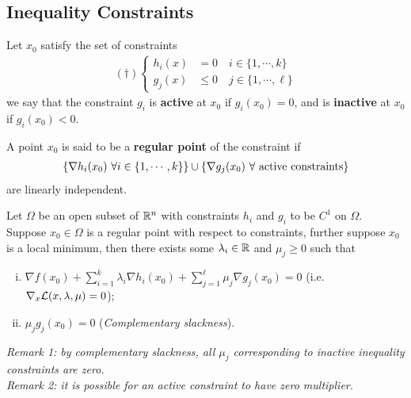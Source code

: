\documentclass{article}
\begin{document}
   	\subsection{Inequality Constraints}
   	\begin{definition}
   		Let $x_0$ satisfy the set of constraints
   		\begin{align}
   			(\dag)\begin{cases}
	   			h_i(x) &= 0\quad i \in \{1, \cdots, k\} \\
   				g_j(x) &\leq 0\quad j \in \{1, \cdots, \ell\}
   			\end{cases}
   		\end{align}
   		we say that the constraint $g_i$ is \textbf{active} at $x_0$ if $g_i(x_0) = 0$, and is \textbf{inactive} at $x_0$ if $g_i(x_0) < 0$.
   	\end{definition}
   	
   	\begin{definition}
   		A point $x_0$ is said to be a \textbf{regular point} of the constraint if 
   		\begin{align}
   			\{\nabla h_i(x_0)\ \forall i \in \{1, \cdots, k\}\}\cup\{ \nabla g_j(x_0)\ \forall \text{{ active constraints}} \}
   		\end{align}
   		are linearly independent. 
   	\end{definition}
   	
   	\begin{theorem}
   		Let $\Omega$ be an open subset of $\mathbb{R}^n$ with constraints $h_i$ and $g_i$ to be $C^1$ on $\Omega$. Suppose $x_0 \in \Omega$ is a regular point with respect to constraints, further suppose $x_0$ is a local minimum, then there exists some $\lambda_i \in \mathbb{R}$ and $\mu_j \geq 0$ such that 
   		\begin{enumerate}[(i)]
   			\item $\nabla f(x_0) + \sum_{i=1}^k \lambda_i \nabla h_i(x_0) + \sum_{j=1}^\ell \mu_j \nabla g_j(x_0) = 0$ (i.e. $\nabla_x \mathcal{{L}}(x, \lambda, \mu) = 0$);
   			\item $\mu_j g_j(x_0) = 0$ (\emph{Complementary slackness}).
   		\end{enumerate}
   		\emph{Remark 1: by complementary slackness, all $\mu_j$ corresponding to inactive inequality constraints are zero.} \\
   		\emph{Remark 2: it is possible for an active constraint to have zero multiplier.}
   	\end{theorem}
   	
\end{document}
